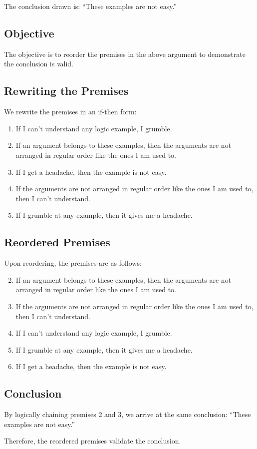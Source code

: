 \documentclass[12pt]{article}
\begin{document}
The conclusion drawn is: ``These examples are not easy.''

\subsection{Objective}

The objective is to reorder the premises in the above argument to demonstrate the conclusion is valid.

\subsection{Rewriting the Premises}

We rewrite the premises in an if-then form:

\begin{enumerate}
    \item If I can't understand any logic example, I grumble.
    \item If an argument belongs to these examples, then the arguments are not arranged in regular order like the ones I am used to.
    \item If I get a headache, then the example is not easy.
    \item If the arguments are not arranged in regular order like the ones I am used to, then I can't understand.
    \item If I grumble at any example, then it gives me a headache.
\end{enumerate}

\subsection{Reordered Premises}

Upon reordering, the premises are as follows:

\begin{enumerate}
    \setcounter{enumi}{1}
    \item If an argument belongs to these examples, then the arguments are not arranged in regular order like the ones I am used to.
    \setcounter{enumi}{3}
    \item If the arguments are not arranged in regular order like the ones I am used to, then I can't understand.
    \setcounter{enumi}{0}
    \item If I can't understand any logic example, I grumble.
    \setcounter{enumi}{4}
    \item If I grumble at any example, then it gives me a headache.
    \setcounter{enumi}{2}
    \item If I get a headache, then the example is not easy.
\end{enumerate}

\subsection{Conclusion}

By logically chaining premises 2 and 3, we arrive at the same conclusion: ``These examples are not easy.''

Therefore, the reordered premises validate the conclusion.
\end{document}
